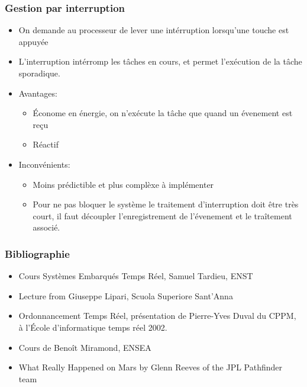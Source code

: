 \documentclass[ignorenonframetext,]{beamer}
\begin{document}
\begin{frame}\frametitle{Gestion par interruption}

\begin{itemize}
\item
  On demande au processeur de lever une intérruption lorsqu'une touche
  est appuyée
\item
  L'interruption intérromp les tâches en cours, et permet l'exécution de
  la tâche sporadique.
\item
  Avantages:

  \begin{itemize}
  \item
    Économe en énergie, on n'exécute la tâche que quand un évenement est
    reçu
  \item
    Réactif
  \end{itemize}
\item
  Inconvénients:

  \begin{itemize}
  \item
    Moins prédictible et plus complèxe à implémenter
  \item
    Pour ne pas bloquer le système le traitement d'interruption doit
    être très court, il faut découpler l'enregistrement de l'évenement
    et le traîtement associé.
  \end{itemize}
\end{itemize}

\end{frame}

\begin{frame}\frametitle{Bibliographie}

\begin{itemize}
\item
  Cours Systèmes Embarqués Temps Réel, Samuel Tardieu, ENST
\item
  Lecture from Giuseppe Lipari, Scuola Superiore Sant'Anna
\item
  Ordonnancement Temps Réel, présentation de Pierre-Yves Duval du CPPM,
  à l'École d'informatique temps réel 2002.
\item
  Cours de Benoît Miramond, ENSEA
\item
  What Really Happened on Mars by Glenn Reeves of the JPL Pathfinder
  team
\end{itemize}

\end{frame}
\end{document}
